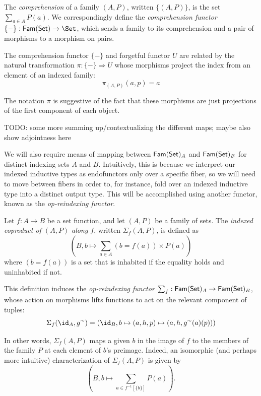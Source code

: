 \begin{definition}
\sloppy
  The \emph{comprehension} of a family $(A,P)$, written $\{(A, P)\}$, is the set $\sum_{a \in A}
  P(a)$. We correspondingly define the \emph{comprehension functor} $\{-\} : \FamSet \to \Set$,
  which sends a family to its comprehension and a pair of morphisms to a morphism on pairs.
\end{definition}

The comprehension functor $\{-\}$ and forgetful functor $U$ are related by the natural
transformation $\pi : \{-\} \Rightarrow U$ whose morphisms project the index from an element of an
indexed family:
\[ \pi_{(A,P)}(a, p) = a \]

The notation $\pi$ is suggestive of the fact that these morphisms are just projections of the first
component of each object.

TODO: some more summing up/contextualizing the different maps; maybe also show adjointness here

We will also require means of mapping between $\mathsf{Fam}(\mathsf{Set})_A$ and $\mathsf{Fam}(\mathsf{Set})_B$ for distinct indexing sets
$A$ and $B$. Intuitively, this is because we interpret our indexed inductive types as endofunctors
only over a specific fiber, so we will need to move between fibers in order to, for instance, fold
over an indexed inductive type into a distinct output type. This will be accomplished using another
functor, known as the \emph{op-reindexing functor}.

\begin{definition}
  Let $f : A \to B$ be a set function, and let $(A, P)$ be a family of sets. The \emph{indexed
  coproduct of $(A, P)$ along $f$}, written $\Sigma_f (A, P)$, is defined as
  \[ \left(B, b \mapsto \sum_{a \in A} (b = f(a)) \times P(a)\right) \]
  where $(b = f(a))$ is a set that is inhabited if the equality holds and uninhabited if not.

  This definition induces the \emph{op-reindexing functor} $\sum_f : \mathsf{Fam}(\mathsf{Set})_A \to \mathsf{Fam}(\mathsf{Set})_B$, whose
  action on morphisms lifts functions to act on the relevant component of tuples:
  \[ \Sigma_f (\id_A, g^\sim) = (\id_B, b \mapsto (a, h, p) \mapsto (a, h, g^\sim(a)(p))) \]
\end{definition}

In other words, $\Sigma_f (A, P)$ maps a given $b$ in the image of $f$ to the members of the family
$P$ at each element of $b$'s preimage. Indeed, an isomorphic (and perhaps more intuitive)
characterization of $\Sigma_f (A, P)$ is given by
\[ \left(B, b \mapsto \sum_{a \in f^{-1}[\{b\}]} P(a)\right). \]

